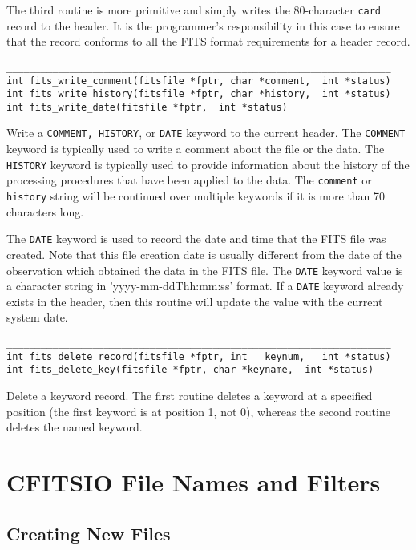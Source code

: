 \documentclass[11pt]{article}
\begin{document}
The third routine is more primitive and simply writes the 80-character
{\tt card} record to the header.  It is the programmer's responsibility
in this case to ensure that the record conforms to all the FITS format
requirements for a header record.

\begin{verbatim}
___________________________________________________________________
int fits_write_comment(fitsfile *fptr, char *comment,  int *status)
int fits_write_history(fitsfile *fptr, char *history,  int *status)
int fits_write_date(fitsfile *fptr,  int *status)
\end{verbatim}

Write a {\tt COMMENT, HISTORY}, or {\tt DATE} keyword to the current
header.  The {\tt COMMENT} keyword is typically used to write a comment
about the file or the data.  The {\tt HISTORY} keyword is typically
used to provide information about the history of the processing
procedures that have been applied to the data.  The {\tt comment} or
{\tt history} string will be continued over multiple keywords if it is
more than 70 characters long.

The {\tt DATE} keyword is used to record the date and time that the
FITS file was created.  Note that this file creation date is usually
different from the date of the observation which obtained the data in
the FITS file.  The {\tt DATE} keyword value is a character string in
'yyyy-mm-ddThh:mm:ss' format. If a {\tt DATE} keyword already exists in
the header, then this routine will update the value with the current
system date.

\begin{verbatim}
___________________________________________________________________
int fits_delete_record(fitsfile *fptr, int   keynum,   int *status)
int fits_delete_key(fitsfile *fptr, char *keyname,  int *status)
\end{verbatim}

Delete a keyword record. The first routine deletes a keyword at a
specified position (the first keyword is at position 1, not 0),
whereas the second routine deletes the named keyword.

\newpage
\section{CFITSIO File Names and Filters}

\subsection{Creating New Files}
\end{document}
